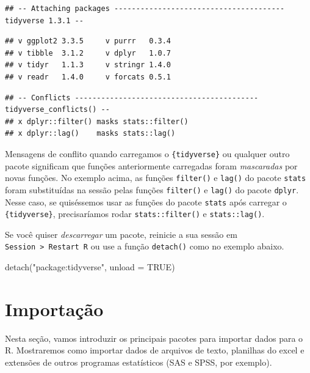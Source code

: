 \documentclass[
]{book}
\newenvironment{Shaded}{\begin{snugshade}}{\end{snugshade}}
\newcommand{\AttributeTok}[1]{\textcolor[rgb]{0.77,0.63,0.00}{#1}}
\newcommand{\ConstantTok}[1]{\textcolor[rgb]{0.00,0.00,0.00}{#1}}
\newcommand{\FunctionTok}[1]{\textcolor[rgb]{0.00,0.00,0.00}{#1}}
\newcommand{\NormalTok}[1]{#1}
\newcommand{\StringTok}[1]{\textcolor[rgb]{0.31,0.60,0.02}{#1}}
\begin{document}
\begin{verbatim}
## -- Attaching packages --------------------------------------- tidyverse 1.3.1 --
\end{verbatim}

\begin{verbatim}
## v ggplot2 3.3.5     v purrr   0.3.4
## v tibble  3.1.2     v dplyr   1.0.7
## v tidyr   1.1.3     v stringr 1.4.0
## v readr   1.4.0     v forcats 0.5.1
\end{verbatim}

\begin{verbatim}
## -- Conflicts ------------------------------------------ tidyverse_conflicts() --
## x dplyr::filter() masks stats::filter()
## x dplyr::lag()    masks stats::lag()
\end{verbatim}

Mensagens de conflito quando carregamos o \texttt{\{tidyverse\}} ou qualquer outro pacote significam que funções anteriormente carregadas foram \emph{mascaradas} por novas funções. No exemplo acima, as funções \texttt{filter()} e \texttt{lag()} do pacote \texttt{stats} foram substituídas na sessão pelas funções \texttt{filter()} e \texttt{lag()} do pacote \texttt{dplyr}. Nesse caso, se quiséssemos usar as funções do pacote \texttt{stats} após carregar o \texttt{\{tidyverse\}}, precisaríamos rodar \texttt{stats::filter()} e \texttt{stats::lag()}.

Se você quiser \emph{descarregar} um pacote, reinicie a sua sessão em \texttt{Session\ \textgreater{}\ Restart\ R} ou use a função \texttt{detach()} como no exemplo abaixo.

\begin{Shaded}
\begin{Highlighting}[]
\FunctionTok{detach}\NormalTok{(}\StringTok{"package:tidyverse"}\NormalTok{, }\AttributeTok{unload =} \ConstantTok{TRUE}\NormalTok{)}
\end{Highlighting}
\end{Shaded}

\hypertarget{importacao}{%
\chapter{Importação}\label{importacao}}

Nesta seção, vamos introduzir os principais pacotes para importar dados para o R. Mostraremos como importar dados de arquivos de texto, planilhas do excel e extensões de outros programas estatísticos (SAS e SPSS, por exemplo).
\end{document}
